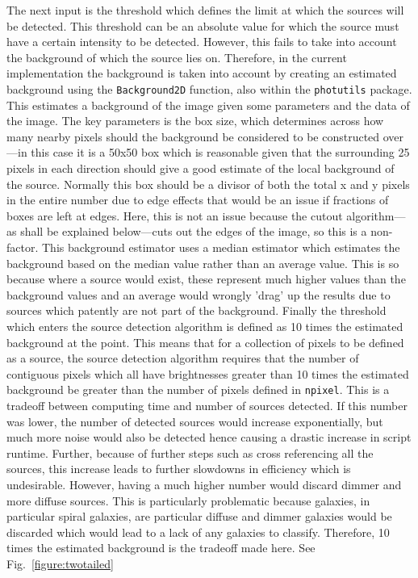 \documentclass[a4paper,fleqn,usenatbib]{mnras}
\begin{document}
The next input is the threshold which defines the limit at which the sources will be detected. This threshold can be an absolute value for which the source must have a certain intensity to be detected. However, this fails to take into account the background of which the source lies on. Therefore, in the current implementation the background is taken into account by creating an estimated background using the \texttt{Background2D} function, also within the \texttt{photutils} package. This estimates a background of the image given some parameters and the data of the image. The key parameters is the box size, which determines across how many nearby pixels should the background be considered to be constructed over---in this case it is a 50x50 box which is reasonable given that the surrounding 25 pixels in each direction should give a good estimate of the local background of the source. Normally this box should be a divisor of both the total x and y pixels in the entire number due to edge effects that would be an issue if fractions of boxes are left at edges. Here, this is not an issue because the cutout algorithm---as shall be explained below---cuts out the edges of the image, so this is a non-factor. This background estimator uses a median estimator which estimates the background based on the median value rather than an average value. \citep{photutils} This is so because where a source would exist, these represent much higher values than the background values and an average would wrongly 'drag' up the results due to sources which patently are not part of the background. Finally the threshold which enters the source detection algorithm is defined as 10 times the estimated background at the point. This means that for a collection of pixels to be defined as a source, the source detection algorithm requires that the number of contiguous pixels which all have brightnesses greater than 10 times the estimated background be greater than the number of pixels defined in \texttt{npixel}. This is a tradeoff between computing time and number of sources detected. If this number was lower, the number of detected sources would increase exponentially, but much more noise would also be detected hence causing a drastic increase in script runtime. Further, because of further steps such as cross referencing all the sources, this increase leads to further slowdowns in efficiency which is undesirable. However, having a much higher number would discard dimmer and more diffuse sources. This is particularly problematic because galaxies, in particular spiral galaxies, are particular diffuse and dimmer galaxies would be discarded which would lead to a lack of any galaxies to classify. Therefore, 10 times the estimated background is the tradeoff made here. See Fig.~\ref{figure:twotailed}
\end{document}
